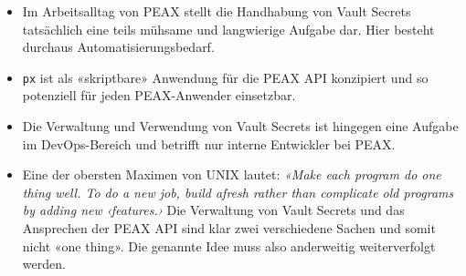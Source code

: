 \begin{itemize}
\begin{itemize}
        \item Im Arbeitsalltag von PEAX stellt die Handhabung von Vault Secrets tatsächlich eine teils mühsame und langwierige Aufgabe dar. Hier besteht durchaus Automatisierungsbedarf.
        \item \texttt{px} ist als «skriptbare» Anwendung für die PEAX API konzipiert und so potenziell für jeden PEAX-Anwender einsetzbar.
        \item Die Verwaltung und Verwendung von Vault Secrets ist hingegen eine Aufgabe im DevOps-Bereich und betrifft nur interne Entwickler bei PEAX.
        \item Eine der obersten Maximen von UNIX lautet: \textit{«Make each program do one thing well. To do a new job, build afresh rather than complicate old programs by adding new ‹features.›} \cite[p. 3]{unixtimesharing} Die Verwaltung von Vault Secrets und das Ansprechen der PEAX API sind klar zwei verschiedene Sachen und somit nicht «one thing». Die genannte Idee muss also anderweitig weiterverfolgt werden.
    \end{itemize}
\end{itemize}
